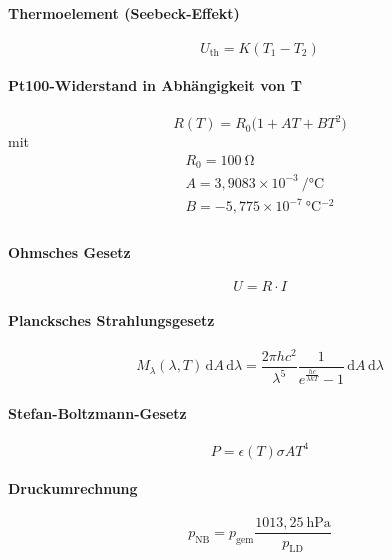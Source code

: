 \documentclass[a4paper,12pt]{article}
\begin{document}
\paragraph{Thermoelement (Seebeck-Effekt)}
\begin{equation}
    U_{\text{th}} = K(T_1 - T_2)
\end{equation}

\paragraph{Pt100-Widerstand in Abhängigkeit von T}
\begin{equation}
    R(T) = R_0 \bigl(1 + A T + B T^2\bigr)
    \label{tab:widerstand-temperatur-formel}
\end{equation}
mit
\begin{equation*}
\begin{gathered}
    R_0 = 100~\si{\ohm} \\
    A = 3{,}9083 \times 10^{-3}~\si{\per\celsius} \\
    B = -5{,}775 \times 10^{-7}~\si{\celsius^{-2}} \\
\end{gathered}
\end{equation*}

\paragraph{Ohmsches Gesetz}
\begin{equation}
    U = R \cdot I
\end{equation}

\paragraph{Plancksches Strahlungsgesetz}
\begin{equation}
M_\lambda(\lambda,T) \, \mathrm{d}A \, \mathrm{d}\lambda = \frac{2\pi h c^2}{\lambda^5} \frac{1}{e^{\frac{hc}{\lambda k T}}-1} \, \mathrm{d}A \, \mathrm{d}\lambda
\end{equation}

\paragraph{Stefan-Boltzmann-Gesetz}
\begin{equation}
P = \epsilon(T) \sigma A T^4
\end{equation}

\paragraph{Druckumrechnung}
\begin{equation}
p_\text{NB} = p_\text{gem} \frac{1013{,}25~\text{hPa}}{p_\text{LD}}
\end{equation}
\end{document}
